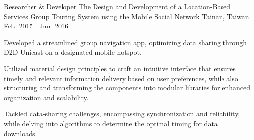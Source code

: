

\begin{cventries}

  \cventry
    {Researcher \& Developer} %
    {The Design and Development of a Location-Based Services Group Touring System using the Mobile Social Network} %
    {Tainan, Taiwan} %
    {Feb. 2015 - Jan. 2016} %
    {
      \begin{cvitems} %
        \item {Developed a streamlined group navigation app, optimizing data sharing through D2D Unicast on a designated mobile hotspot.}
        \item {Utilized material design principles to craft an intuitive interface that ensures timely and relevant information delivery based on user preferences, while also structuring and transforming the components into modular libraries for enhanced organization and scalability.}
        \item {Tackled data-sharing challenges, encompassing synchronization and reliability, while delving into algorithms to determine the optimal timing for data downloads.}
      \end{cvitems}
    }

\end{cventries}
